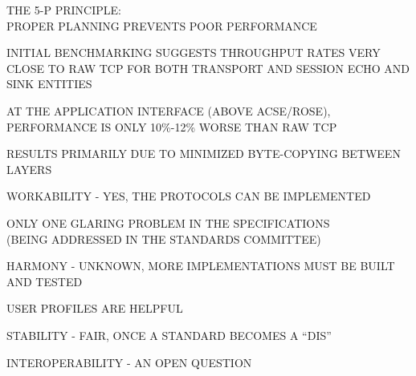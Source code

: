 \begin{bwslide}

\begin{nrtc}
\item	THE 5-P PRINCIPLE:\\
	PROPER PLANNING PREVENTS POOR PERFORMANCE

\item	INITIAL BENCHMARKING SUGGESTS THROUGHPUT RATES VERY CLOSE TO RAW TCP
	FOR BOTH TRANSPORT AND SESSION ECHO AND SINK ENTITIES

\item	AT THE APPLICATION INTERFACE (ABOVE ACSE/ROSE),
	PERFORMANCE IS ONLY 10\%-12\% WORSE THAN RAW TCP

\item	RESULTS PRIMARILY DUE TO MINIMIZED BYTE-COPYING BETWEEN
	LAYERS
\end{nrtc}
\end{bwslide}


\begin{bwslide}

\begin{nrtc}
\item	WORKABILITY - YES, THE PROTOCOLS CAN BE IMPLEMENTED
    \begin{nrtc}
    \item	ONLY ONE GLARING PROBLEM IN THE SPECIFICATIONS\\
		(BEING ADDRESSED IN THE STANDARDS COMMITTEE)
    \end{nrtc}

\item	HARMONY - UNKNOWN, MORE IMPLEMENTATIONS MUST BE BUILT AND TESTED
    \begin{nrtc}
    \item	USER PROFILES ARE HELPFUL
    \end{nrtc}

\item	STABILITY - FAIR, ONCE A STANDARD BECOMES A ``DIS''

\item	INTEROPERABILITY - AN OPEN QUESTION
\end{nrtc}
\end{bwslide}


